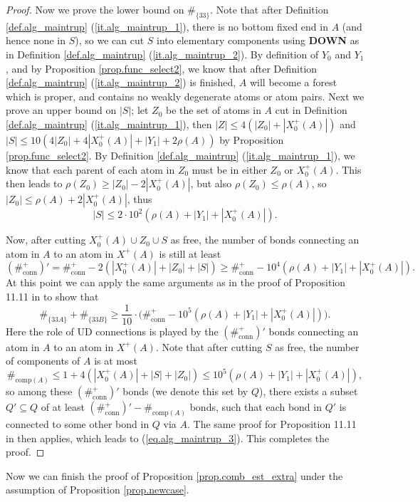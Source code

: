 \documentclass[10pt, reqno]{amsart}
\theoremstyle{definition}
\theoremstyle{remark}
\numberwithin{equation}{section}
\begin{document}
\begin{proof}
Now we prove the lower bound on $\#_{\{33\}}$. Note that after Definition \ref{def.alg_maintrup} (\ref{it.alg_maintrup_1}), there is no bottom fixed end in $A$ (and hence none in $S$), so we can cut $S$ into elementary components using \textbf{DOWN} as in Definition \ref{def.alg_maintrup} (\ref{it.alg_maintrup_2}). By definition of $Y_0$ and $Y_1$, and by Proposition \ref{prop.func_select2}, we know that after Definition \ref{def.alg_maintrup} (\ref{it.alg_maintrup_2}) is finished, $A$ will become a forest which is proper, and contains no weakly degenerate atoms or atom pairs. Next we prove an upper bound on $|S|$; let $Z_0$ be the set of atoms in $A$ cut in Definition \ref{def.alg_maintrup} (\ref{it.alg_maintrup_1}), then $|Z|\leq 4(|Z_0|+|X_0^+(A)|)$ and $|S|\leq 10(4|Z_0|+4|X_0^+(A)|+|Y_1|+2\rho(A))$ by Proposition \ref{prop.func_select2}. By Definition \ref{def.alg_maintrup} (\ref{it.alg_maintrup_1}), we know that each parent of each atom in $Z_0$ must be in either  $Z_0$ or $X_0^+(A)$. This then leads to $\rho(Z_0)\geq |Z_0|-2|X_0^+(A)|$, but also $\rho(Z_0)\leq\rho(A)$, so $|Z_0|\leq \rho(A)+2|X_0^+(A)|$, thus
\[|S|\leq 2\cdot 10^2(\rho(A)+|Y_1|+|X_0^+(A)|).\]

Now, after cutting $X_0^+(A)\cup Z_0\cup S$ as free, the number of bonds connecting an atom in $A$ to an atom in $X^+(A)$ is still at least \[(\#_{\mathrm{conn}}^+)'=\#_{\mathrm{conn}}^+-2(|X_0^+(A)|+|Z_0|+|S|)\geq\#_{\mathrm{conn}}^+-10^4(\rho(A)+|Y_1|+|X_0^+(A)|).\] At this point we can apply the same arguments as in the proof of Proposition 11.11 in \cite{DHM24} to show that
\begin{equation}\label{eq.alg_maintrup_3}\#_{\{33A\}}+\#_{\{33B\}}\geq\frac{1}{10}\cdot \big(\#_{\mathrm{conn}}^+-10^5(\rho(A)+|Y_1|+|X_0^+(A)|)\big).\end{equation} Here the role of UD connections is played by the $(\#_{\mathrm{conn}}^+)'$ bonds connecting an atom in $A$ to an atom in $X^+(A)$. Note that after cutting $S$ as free, the number of components of $A$ is at most
\[\#_{\mathrm{comp}(A)}\leq 1+4(|X_0^+(A)|+|S|+|Z_0|)\leq 10^5(\rho(A)+|Y_1|+|X_0^+(A)|),\] so among these $(\#_{\mathrm{conn}}^+)'$ bonds (we denote this set by $Q$), there exists a subset $Q'\subseteq Q$ of at least $(\#_{\mathrm{conn}}^+)'-\#_{\mathrm{comp}(A)}$ bonds, such that each bond in $Q'$ is connected to some other bond in $Q$ via $A$. The same proof for Proposition 11.11 in \cite{DHM24} then applies, which leads to (\ref{eq.alg_maintrup_3}). This completes the proof.
\end{proof}
Now we can finish the proof of Proposition \ref{prop.comb_est_extra} under the assumption of Proposition \ref{prop.newcase}.
\end{document}
